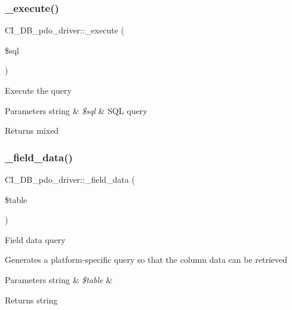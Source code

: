 \subsubsection{\texorpdfstring{\+\_\+execute()}{\_execute()}}
{\footnotesize\ttfamily C\+I\+\_\+\+D\+B\+\_\+pdo\+\_\+driver\+::\+\_\+execute (\begin{DoxyParamCaption}\item[{}]{\$sql }\end{DoxyParamCaption})\hspace{0.3cm}{\ttfamily [protected]}}

Execute the query


\begin{DoxyParams}[1]{Parameters}
string & {\em \$sql} & S\+QL query \\
\hline
\end{DoxyParams}
\begin{DoxyReturn}{Returns}
mixed 
\end{DoxyReturn}
\mbox{\label{class_c_i___d_b__pdo__driver_a0a6e0ba0e25b3c56d18249df1bcfd261}} 
\subsubsection{\texorpdfstring{\+\_\+field\+\_\+data()}{\_field\_data()}}
{\footnotesize\ttfamily C\+I\+\_\+\+D\+B\+\_\+pdo\+\_\+driver\+::\+\_\+field\+\_\+data (\begin{DoxyParamCaption}\item[{}]{\$table }\end{DoxyParamCaption})\hspace{0.3cm}{\ttfamily [protected]}}

Field data query

Generates a platform-\/specific query so that the column data can be retrieved


\begin{DoxyParams}[1]{Parameters}
string & {\em \$table} & \\
\hline
\end{DoxyParams}
\begin{DoxyReturn}{Returns}
string 
\end{DoxyReturn}
\mbox{\label{class_c_i___d_b__pdo__driver_a5cb4f9eb3d9ba1b7042dd5c097dbfe40}} 
